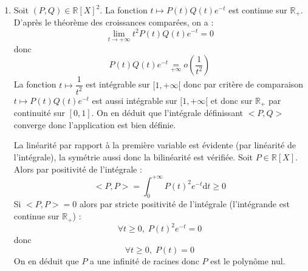 \documentclass[a4paper,twoside,french,11pt]{VcCours}
\newcommand{\dt}{\text{d}t}
\begin{document}
\begin{enumerate}
\item Soit $(P,Q) \in \mathbb{R}[X]^2$. La fonction $t \mapsto P(t)Q(t)e^{-t}$ est continue sur $\mathbb{R}_+$. D'après le théorème des croissances comparées, on a :
$$ \lim_{t \rightarrow + \infty} t^2P(t)Q(t) e^{-t} = 0$$
donc 
$$ P(t)Q(t) e^{-t} \underset{+ \infty}{=} o \left( \dfrac{1}{t^2} \right)$$
La fonction $t \mapsto \dfrac{1}{t^2}$ est intégrable sur $[1, + \infty[$ donc par critère de comparaison $t \mapsto P(t)Q(t)e^{-t}$ est aussi intégrable sur $[1, + \infty[$ et donc sur $\mathbb{R}_+$ par continuité sur $[0,1]$. On en déduit que l'intégrale définissant $<P,Q>$ converge donc l'application est bien définie.


\noindent La linéarité par rapport à la première variable est évidente (par linéarité de l'intégrale), la symétrie aussi donc la bilinéarité est vérifiée. Soit $P \in \mathbb{R}[X]$. Alors par positivité de l'intégrale :
$$ <P,P> = \int_0^{+ \infty} P(t)^2 e^{-t} \dt \geq 0$$
Si $<P,P>=0$ alors par stricte positivité de l'intégrale (l'intégrande est continue sur $\mathbb{R}_+$) :
$$ \forall t \geq 0, \; P(t)^2 e^{-t} = 0$$
donc
$$ \forall t \geq 0, \; P(t)=0$$
On en déduit que $P$ a une infinité de racines donc $P$ est le polynôme nul.



\end{enumerate}
\end{document}
